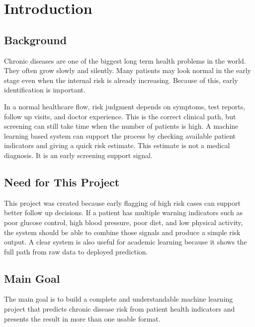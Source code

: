 \documentclass[12pt,a4paper,openany]{report}
\begin{document}
    \chapter{Introduction}
    \section{Background}
    Chronic diseases are one of the biggest long term health problems in the world. They often grow slowly and silently. Many patients may look normal in the early stage even when the internal risk is already increasing. Because of this, early identification is important.

    In a normal healthcare flow, risk judgment depends on symptoms, test reports, follow up visits, and doctor experience. This is the correct clinical path, but screening can still take time when the number of patients is high. A machine learning based system can support the process by checking available patient indicators and giving a quick risk estimate. This estimate is not a medical diagnosis. It is an early screening support signal.

    \section{Need for This Project}
    This project was created because early flagging of high risk cases can support better follow up decisions. If a patient has multiple warning indicators such as poor glucose control, high blood pressure, poor diet, and low physical activity, the system should be able to combine those signals and produce a simple risk output. A clear system is also useful for academic learning because it shows the full path from raw data to deployed prediction.

    \section{Main Goal}
    The main goal is to build a complete and understandable machine learning project that predicts chronic disease risk from patient health indicators and presents the result in more than one usable format.
\end{document}
